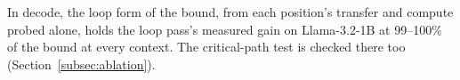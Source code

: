 In decode, the loop form of the bound, from each position's transfer and compute probed alone, holds the loop pass's measured gain on Llama-3.2-1B at 99--100\% of the bound at every context.
The critical-path test is checked there too (Section~\ref{subsec:ablation}).

